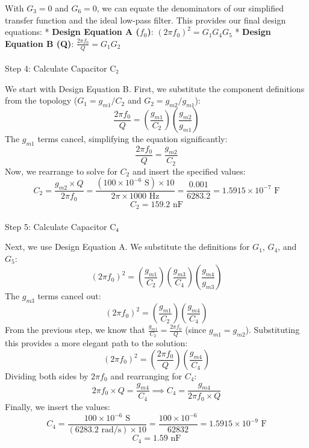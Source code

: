 \documentclass[
  letterpaper,
  DIV=11,
  numbers=noendperiod]{scrreprt}
\makeatletter
\let\oldparagraph\paragraph
\renewcommand{\paragraph}{
    \@ifstar
      \xxxParagraphStar
      \xxxParagraphNoStar
  }
\newcommand{\xxxParagraphStar}[1]{\oldparagraph*{#1}\mbox{}}
\newcommand{\xxxParagraphNoStar}[1]{\oldparagraph{#1}\mbox{}}
\makeatother
\begin{document}
With \(G_3=0\) and \(G_6=0\), we can equate the denominators of our
simplified transfer function and the ideal low-pass filter. This
provides our final design equations: * \textbf{Design Equation A
(\(f_0\))}: \((2\pi f_0)^2 = G_1 G_4 G_5\) * \textbf{Design Equation B
(Q)}: \(\frac{2\pi f_0}{Q} = G_1 G_2\)

\paragraph{Step 4: Calculate Capacitor
C₂}\label{step-4-calculate-capacitor-cux2082}

We start with Design Equation B. First, we substitute the component
definitions from the topology (\(G_1 = g_{m1} / C_2\) and
\(G_2 = g_{m2} / g_{m1}\)):
\[ \frac{2\pi f_0}{Q} = \left(\frac{g_{m1}}{C_2}\right) \left(\frac{g_{m2}}{g_{m1}}\right) \]
The \(g_{m1}\) terms cancel, simplifying the equation significantly:
\[ \frac{2\pi f_0}{Q} = \frac{g_{m2}}{C_2} \] Now, we rearrange to solve
for \(C_2\) and insert the specified values:
\[ C_2 = \frac{g_{m2} \times Q}{2\pi f_0} = \frac{(100 \times 10^{-6} \text{ S}) \times 10}{2 \pi \times 1000 \text{ Hz}} = \frac{0.001}{6283.2} = 1.5915 \times 10^{-7} \text{ F} \]
\[ C_2 = 159.2 \text{ nF} \]

\paragraph{Step 5: Calculate Capacitor
C₄}\label{step-5-calculate-capacitor-cux2084}

Next, we use Design Equation A. We substitute the definitions for
\(G_1\), \(G_4\), and \(G_5\):
\[ (2\pi f_0)^2 = \left(\frac{g_{m1}}{C_2}\right) \left(\frac{g_{m3}}{C_4}\right) \left(\frac{g_{m4}}{g_{m3}}\right) \]
The \(g_{m3}\) terms cancel out:
\[ (2\pi f_0)^2 = \left(\frac{g_{m1}}{C_2}\right) \left(\frac{g_{m4}}{C_4}\right) \]
From the previous step, we know that
\(\frac{g_{m1}}{C_2} = \frac{2\pi f_0}{Q}\) (since \(g_{m1}=g_{m2}\)).
Substituting this provides a more elegant path to the solution:
\[ (2\pi f_0)^2 = \left(\frac{2\pi f_0}{Q}\right) \left(\frac{g_{m4}}{C_4}\right) \]
Dividing both sides by \(2\pi f_0\) and rearranging for \(C_4\):
\[ 2\pi f_0 \times Q = \frac{g_{m4}}{C_4} \implies C_4 = \frac{g_{m4}}{2\pi f_0 \times Q} \]
Finally, we insert the values:
\[ C_4 = \frac{100 \times 10^{-6} \text{ S}}{(6283.2 \text{ rad/s}) \times 10} = \frac{100 \times 10^{-6}}{62832} = 1.5915 \times 10^{-9} \text{ F} \]
\[ C_4 = 1.59 \text{ nF} \]
\end{document}
